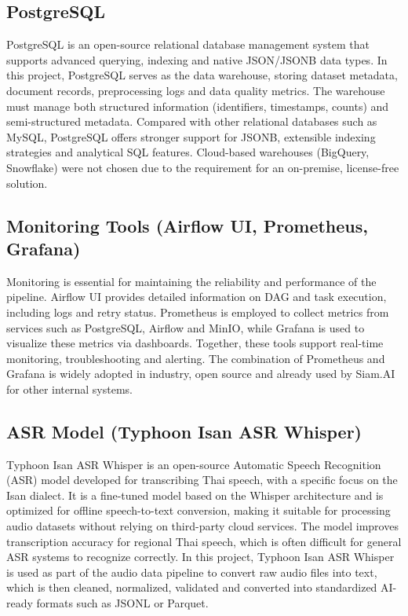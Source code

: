 \documentclass[12pt,oneside,openright,a4paper]{cpe-english-project}
\begin{document}
\subsection{PostgreSQL}
PostgreSQL is an open-source relational database management system that supports advanced querying, indexing and native JSON/JSONB data types. In this project, PostgreSQL serves as the data warehouse, storing dataset metadata, document records, preprocessing logs and data quality metrics. The warehouse must manage both structured information (identifiers, timestamps, counts) and semi-structured metadata. Compared with other relational databases such as MySQL, PostgreSQL offers stronger support for JSONB, extensible indexing strategies and analytical SQL features. Cloud-based warehouses (BigQuery, Snowflake) were not chosen due to the requirement for an on-premise, license-free solution.

\subsection{Monitoring Tools (Airflow UI, Prometheus, Grafana)}
Monitoring is essential for maintaining the reliability and performance of the pipeline. Airflow UI provides detailed information on DAG and task execution, including logs and retry status. Prometheus is employed to collect metrics from services such as PostgreSQL, Airflow and MinIO, while Grafana is used to visualize these metrics via dashboards. Together, these tools support real-time monitoring, troubleshooting and alerting. The combination of Prometheus and Grafana is widely adopted in industry, open source and already used by Siam.AI for other internal systems.
\newpage
\subsection{ASR Model (Typhoon Isan ASR Whisper)}
Typhoon Isan ASR Whisper is an open-source Automatic Speech Recognition (ASR) model developed for transcribing Thai speech, with a specific focus on the Isan dialect. It is a fine-tuned model based on the Whisper architecture and is optimized for offline speech-to-text conversion, making it suitable for processing audio datasets without relying on third-party cloud services. The model improves transcription accuracy for regional Thai speech, which is often difficult for general ASR systems to recognize correctly. In this project, Typhoon Isan ASR Whisper is used as part of the audio data pipeline to convert raw audio files into text, which is then cleaned, normalized, validated and converted into standardized AI-ready formats such as JSONL or Parquet.
\end{document}
